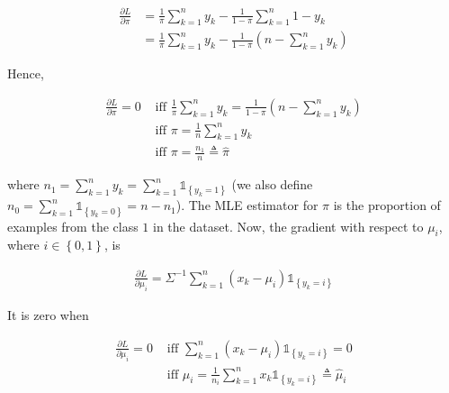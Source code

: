 \documentclass[a4paper, 11pt]{report}
\begin{document}
\begin{enumerate}[label=\alph*]
    \begin{equation*}
        \begin{aligned}
        \frac{\partial L}{\partial \pi} &= \frac{1}{\pi} \sum_{k=1}^{n} y_{k} - \frac{1}{1 - \pi} \sum_{k=1}^{n} 1 - y_{k} \\
        &= \frac{1}{\pi} \sum_{k=1}^{n} y_{k} - \frac{1}{1 - \pi} \left( n - \sum_{k=1}^{n} y_{k} \right)
        \end{aligned}
    \end{equation*}
    
    Hence, 
    
    \begin{equation*}
        \begin{aligned}
        \frac{\partial L}{\partial \pi} = 0 &\text{ iff } \frac{1}{\pi} \sum_{k=1}^{n} y_{k} = \frac{1}{1 - \pi} \left( n - \sum_{k=1}^{n} y_{k} \right) \\
        &\text{ iff } \pi = \frac{1}{n} \sum_{k=1}^{n} y_{k} \\
        &\text{ iff } \pi = \frac{n_{1}}{n} \triangleq \widehat{\pi}
        \end{aligned}
    \end{equation*}
    
    where $n_{1} = \sum_{k=1}^{n} y_{k} = \sum_{k=1}^{n} \mathds{1}_{\left\{ y_{k} = 1 \right\}}$ (we also define $n_{0} = \sum_{k=1}^{n} \mathds{1}_{\left\{ y_{k} = 0 \right\}} = n - n_{1}$). The MLE estimator for $\pi$ is the proportion of examples from the class $1$ in the dataset. Now, the gradient with respect to $\mu_{i}$, where $i \in \left\{ 0, 1 \right\}$, is
    
    \begin{equation*}
        \begin{aligned}
        \frac{\partial L}{\partial \mu_{i}} = \Sigma^{-1} \sum_{k=1}^{n} \left( x_{k} - \mu_{i} \right) \mathds{1}_{\left\{ y_k = i \right\}}
        \end{aligned}
    \end{equation*}
    
    It is zero when
    
    \begin{equation*}
        \begin{aligned}
        \frac{\partial L}{\partial \mu_{i}} = 0 &\text{ iff } \sum_{k=1}^{n} \left( x_{k} - \mu_{i} \right) \mathds{1}_{\left\{ y_{k} = i \right\}} = 0 \\
        &\text{ iff } \mu_{i} = \frac{1}{n_{i}} \sum_{k=1}^{n} x_{k} \mathds{1}_{\left\{ y_{k} = i \right\}} \triangleq \widehat{\mu}_{i}
        \end{aligned}
    \end{equation*}
    

\end{enumerate}
\end{document}
